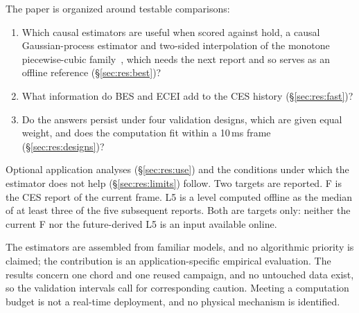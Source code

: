 The paper is organized around testable comparisons:
\begin{enumerate}\setlength{\itemsep}{1pt}\setlength{\parskip}{0pt}
\item Which causal estimators are useful when scored against hold, a causal Gaussian-process estimator and two-sided interpolation of the monotone piecewise-cubic family~\citep{fritsch1980}, which needs the next report and so serves as an offline reference (\S\ref{sec:res:best})?
\item What information do BES and ECEI add to the CES history (\S\ref{sec:res:fast})?
\item Do the answers persist under four validation designs, which are given equal weight, and does the computation fit within a 10\,ms frame (\S\ref{sec:res:designs})?
\end{enumerate}
Optional application analyses (\S\ref{sec:res:use}) and the conditions under which the estimator does not help (\S\ref{sec:res:limits}) follow. Two targets are reported. F is the CES report of the current frame. L5 is a level computed offline as the median of at least three of the five subsequent reports. Both are targets only: neither the current F nor the future-derived L5 is an input available online.

The estimators are assembled from familiar models, and no algorithmic priority is claimed; the contribution is an application-specific empirical evaluation. The results concern one chord and one reused campaign, and no untouched data exist, so the validation intervals call for corresponding caution. Meeting a computation budget is not a real-time deployment, and no physical mechanism is identified.
